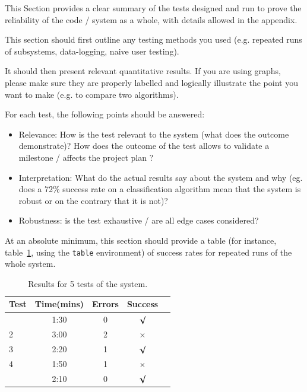 \documentclass{article}
\begin{document}
This Section provides a clear summary of the tests designed and run to prove the reliability of the code / system as a whole, with details allowed in the appendix.  

This section should first outline any testing methods you used (e.g. repeated runs of subsystems, data-logging, naive user testing). 

It should then present relevant quantitative results. If you are using graphs, please make sure they are properly labelled and logically illustrate the point you want to make (e.g. to compare two algorithms).

For each test, the following points should be answered:

\begin{itemize}
    \item Relevance: How is the test relevant to the system (what does the outcome demonstrate)? How does the outcome of the test allows to validate a milestone / affects the project plan ?
    \item Interpretation: What do the actual results say about the system and why (eg. does a 72\% success rate on a classification algorithm mean that the system is robust or on the contrary that it is not)?
    \item Robustness: is the test exhaustive / are all edge cases considered?
\end{itemize}


At an absolute minimum, this section should provide a table (for instance, table~\ref{tab:sample-table}, using the \verb+table+ environment) of success rates for repeated runs of the whole system.

\begin{table}[h]
\vskip 3mm
\begin{center}
\begin{small}
\begin{sc}
\begin{tabular}{lcccr}
\hline
\abovespace\belowspace
Test  & Time(mins) & Errors & Success \\
\hline
\abovespace
1    & 1:30 & 0 & $\surd$ \\
2    & 3:00 & 2 & $\times$\\
3    & 2:20 & 1 & $\surd$ \\
4    & 1:50 & 1 & $\times$\\
\belowspace
5    & 2:10 & 0 & $\surd$ \\
\hline
\end{tabular}
\end{sc}
\end{small}
\caption{Results for 5 tests of the system.}
\label{tab:sample-table}
\end{center}
\vskip -3mm
\end{table}
\end{document}
